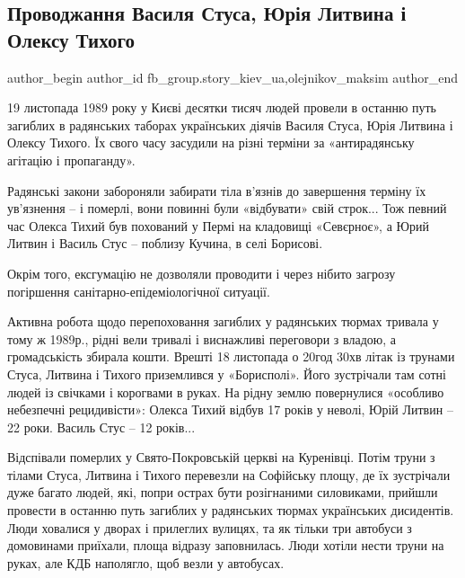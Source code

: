  
 
 
 
 
 
\subsection{Проводжання Василя Стуса, Юрія Литвина і Олексу Тихого}
\label{sec:23_12_2022.fb.fb_group.story_kiev_ua.1.provodzhannja}
 
\ifcmt
 author_begin
   author_id fb_group.story_kiev_ua,olejnikov_maksim
 author_end
\fi

19 листопада 1989 року у Києві десятки тисяч людей провели в останню путь
загиблих в радянських таборах українських діячів Василя Стуса, Юрія Литвина і
Олексу Тихого. Їх свого часу засудили на різні терміни за «антирадянську
агітацію і пропаганду».

Радянські закони забороняли забирати тіла в'язнів до завершення терміну їх
ув'язнення – і померлі, вони повинні були «відбувати» свій строк... Тож певний
час Олекса Тихий був похований у Пермі на кладовищі «Севєрноє», а Юрий Литвин і
Василь Стус – поблизу Кучина, в селі Борисові.

Окрім того, ексгумацію не дозволяли проводити і через нібито загрозу погіршення
санітарно-епідеміологічної ситуації.

Активна робота щодо перепоховання загиблих у радянських тюрмах тривала у тому ж
1989р., рідні вели тривалі і виснажливі переговори з владою, а громадськість
збирала кошти. Врешті 18 листопада о 20год 30хв літак із трунами Стуса, Литвина
і Тихого приземлився у «Борисполі». Його зустрічали там сотні людей із свічками
і корогвами в руках. На рідну землю повернулися «особливо небезпечні
рецидивісти»:  Олекса Тихий відбув 17 років у неволі, Юрій Литвин – 22 роки.
Василь Стус – 12 років...

Відспівали померлих у Свято-Покровській церкві на Куренівці. Потім труни з
тілами Стуса, Литвина і Тихого перевезли на Софійську площу, де їх зустрічали
дуже багато людей, які, попри острах бути розігнаними силовиками, прийшли
провести в останню путь загиблих у радянських тюрмах українських дисидентів.
Люди ховалися у дворах і прилеглих вулицях, та як тільки три автобуси з
домовинами приїхали, площа відразу заповнилась. Люди хотіли нести труни на
руках, але КДБ наполягло, щоб везли у автобусах.

